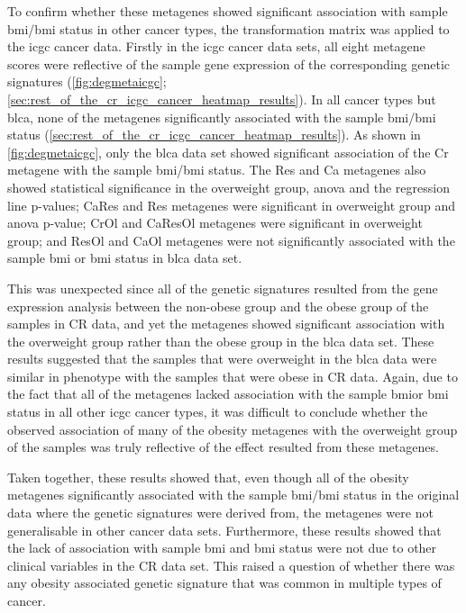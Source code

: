 To confirm whether these metagenes showed significant association with sample \gls{bmi}/\gls{bmi} status in other cancer types, the transformation matrix was applied to the \gls{icgc} cancer data.
Firstly in the \gls{icgc} cancer data sets, all eight metagene scores were reflective of the sample gene expression of the corresponding genetic signatures (\cref{fig:degmetaicgc}; \cref{sec:rest_of_the_cr_icgc_cancer_heatmap_results}).
In all cancer types but \gls{blca}, none of the metagenes significantly associated with the sample \gls{bmi}/\gls{bmi} status (\cref{sec:rest_of_the_cr_icgc_cancer_heatmap_results}).
As shown in \cref{fig:degmetaicgc}, only the \gls{blca} data set showed significant association of the Cr metagene with the sample \gls{bmi}/\gls{bmi} status.
The Res and Ca metagenes also showed statistical significance in the overweight group, \gls{anova} and the regression line p-values; CaRes and Res metagenes were significant in overweight group and \gls{anova} p-value; CrOl and CaResOl metagenes were significant in overweight group; and ResOl and CaOl metagenes were not significantly associated with the sample \gls{bmi} or \gls{bmi} status in \gls{blca} data set.

This was unexpected since all of the genetic signatures resulted from the  gene expression analysis between the non-obese group and the obese group of the samples in CR data, and yet the metagenes showed significant association with the overweight group rather than the obese group in the \gls{blca} data set.
These results suggested that the samples that were overweight in the \gls{blca} data were similar in phenotype with the samples that were obese in CR data.
Again, due to the fact that all of the metagenes lacked association with the sample \gls{bmi}or \gls{bmi} status in all other \gls{icgc} cancer types, it was difficult to conclude whether the observed association of many of the obesity metagenes with the overweight group of the samples was truly reflective of the effect resulted from these metagenes.

Taken together, these results showed that, even though all of the obesity metagenes significantly associated with the sample \gls{bmi}/\gls{bmi} status in the original data where the genetic signatures were derived from, the metagenes were not generalisable in other cancer data sets.
Furthermore, these results showed that the lack of association with sample \gls{bmi} and \gls{bmi} status were not due to other clinical variables in the CR data set.
This raised a question of whether there was any obesity associated genetic signature that was common in multiple types of cancer.

